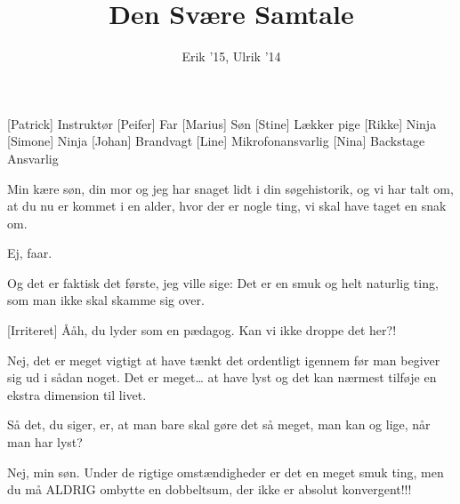 \documentclass[a4paper,11pt]{article}
\title{Den Svære Samtale}
\author{Erik '15, Ulrik '14}
\begin{document}
\maketitle

\begin{roles}
[Patrick] Instruktør
[Peifer] Far
[Marius] Søn
[Stine] Lækker pige
[Rikke] Ninja
[Simone] Ninja
[Johan] Brandvagt
[Line] Mikrofonansvarlig
[Nina] Backstage Ansvarlig
\end{roles}




\begin{sketch}

 Min kære søn, din mor og jeg har snaget lidt i din søgehistorik, og vi har talt om, at du nu er kommet i en alder, hvor der er nogle ting, vi skal have taget en snak om.

 Ej, faar.

 Og det er faktisk det første, jeg ville sige: Det er en smuk og helt naturlig ting, som man ikke skal skamme sig over.

[Irriteret] Ååh, du lyder som en pædagog. Kan vi ikke droppe det her?!

 Nej, det er meget vigtigt at have tænkt det ordentligt igennem før man begiver sig ud i sådan noget. Det er meget… at have lyst og det kan nærmest tilføje en ekstra dimension til livet.

 Så det, du siger, er, at man bare skal gøre det så meget, man kan og lige, når man har lyst?

 Nej, min søn. Under de rigtige omstændigheder er det en meget smuk ting, men du må ALDRIG ombytte en dobbeltsum, der ikke er absolut konvergent!!!


\end{sketch}
\end{document}
